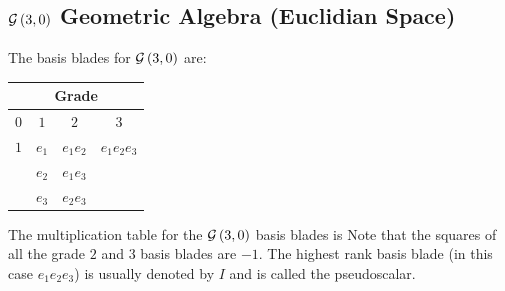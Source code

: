 \subsection{$\mathcal{G}\left ( {3,0} \right )$ Geometric Algebra (Euclidian Space)}\label{subsect_Euclidian}
The basis blades for $\mathcal{G}\left ( {3,0} \right )$ are:
\begin{center}
\begin{tabular}{cccc}\\
\multicolumn{4}{c}{Grade} \\ \hline
$0$ & $1$ & $2$ & $3$ \\ \hline
$1$ & $e_{1}$ & $e_{1}e_{2}$ & $e_{1}e_{2}e_{3}$ \\
  & $e_{2}$ & $e_{1}e_{3}$ &                     \\
  & $e_{3}$ & $e_{2}e_{3}$ &
\end{tabular}
\end{center}
The multiplication table for the $\mathcal{G}\left ( {3,0} \right )$ basis blades is
\eenn
Note that the squares of all the grade $2$ and $3$ basis blades are $-1$. The highest rank basis blade
(in this case $e_{1}e_{2}e_{3}$) is usually denoted by $I$ and is called the pseudoscalar.

